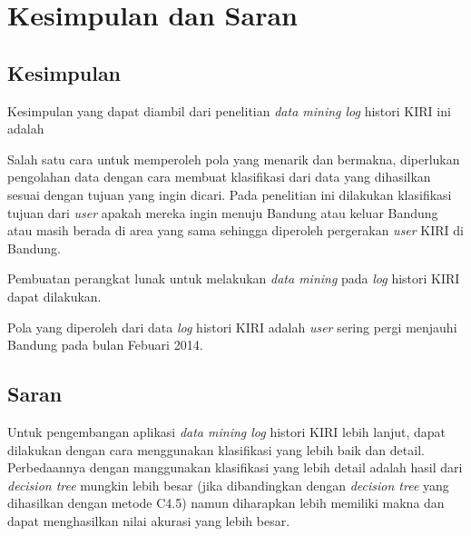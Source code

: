 \chapter{Kesimpulan dan Saran}

\section{Kesimpulan}

Kesimpulan yang dapat diambil dari penelitian \textsl{data mining log} histori KIRI ini adalah 

Salah satu cara untuk memperoleh pola yang menarik dan bermakna, diperlukan pengolahan data dengan cara membuat klasifikasi dari data yang dihasilkan sesuai dengan tujuan yang ingin dicari. Pada penelitian ini dilakukan klasifikasi tujuan dari \textsl{user} apakah mereka ingin menuju Bandung atau keluar Bandung atau masih berada di area yang sama sehingga diperoleh pergerakan \textsl{user} KIRI di Bandung.

Pembuatan perangkat lunak untuk melakukan \textsl{data mining} pada \textsl{log} histori KIRI dapat dilakukan.

Pola yang diperoleh dari data \textsl{log} histori KIRI adalah \textsl{user} sering pergi menjauhi Bandung pada bulan Febuari 2014.

\section{Saran}
Untuk pengembangan aplikasi \textsl{data mining log} histori KIRI lebih lanjut, dapat dilakukan dengan cara menggunakan klasifikasi yang lebih baik dan detail. Perbedaannya dengan manggunakan klasifikasi yang lebih detail adalah hasil dari \textsl{decision tree} mungkin lebih besar (jika dibandingkan dengan \textsl{decision tree} yang dihasilkan dengan metode C4.5) namun diharapkan lebih memiliki makna dan dapat menghasilkan nilai akurasi yang lebih besar.

